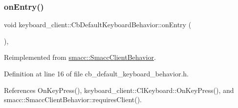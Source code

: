 \mbox{\label{classkeyboard__client_1_1CbDefaultKeyboardBehavior_a1ac673a9d9a733215f665810d6cf69aa}} 
\subsubsection{\texorpdfstring{on\+Entry()}{onEntry()}}
{\footnotesize\ttfamily void keyboard\+\_\+client\+::\+Cb\+Default\+Keyboard\+Behavior\+::on\+Entry (\begin{DoxyParamCaption}{ }\end{DoxyParamCaption})\hspace{0.3cm}{\ttfamily [inline]}, {\ttfamily [virtual]}}



Reimplemented from \hyperlink{classsmacc_1_1SmaccClientBehavior_a7962382f93987c720ad432fef55b123f}{smacc\+::\+Smacc\+Client\+Behavior}.



Definition at line 16 of file cb\+\_\+default\+\_\+keyboard\+\_\+behavior.\+h.



References On\+Key\+Press(), keyboard\+\_\+client\+::\+Cl\+Keyboard\+::\+On\+Key\+Press(), and smacc\+::\+Smacc\+Client\+Behavior\+::requires\+Client().


